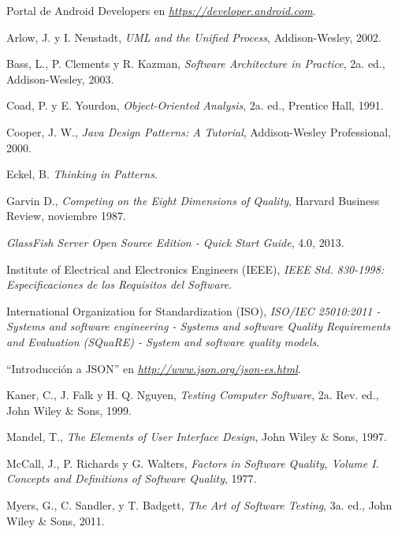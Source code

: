 \begin{thebibliography}{} %
	
	Portal de Android Developers en
	\emph{\url{https://developer.android.com}}.
	
	Arlow, J. y I. Neustadt, 
	\emph{UML and the Unified Process}, 
	Addison-Wesley, 
	2002.
	
	Bass, L., P. Clements y R. Kazman, 
	\emph{Software Architecture in Practice}, 
	2a. ed., 
	Addison-Wesley, 
	2003.
	
	Coad, P. y E. Yourdon, 
	\emph{Object-Oriented Analysis}, 
	2a. ed., 
	Prentice Hall, 
	1991.
	
	Cooper, J. W.,
	\emph{Java Design Patterns: A Tutorial}, 
	Addison-Wesley Professional, 
	2000.
	
	Eckel, B.
	\emph{Thinking in Patterns}.
	
	Garvin D.,
	\emph{Competing on the Eight Dimensions of Quality},
	Harvard Business Review, 
	noviembre 1987.
	
	\emph{GlassFish Server Open Source Edition - Quick Start Guide},
	4.0,
	2013.
	
	Institute of Electrical and Electronics Engineers (IEEE),
	\emph{IEEE Std. 830-1998: Especificaciones de los Requisitos del Software}.
	
	International Organization for Standardization (ISO),
	\emph{ISO/IEC 25010:2011 - Systems and software engineering - Systems and software Quality Requirements and Evaluation (SQuaRE) - System and software quality models}.
	
	``Introducción a JSON'' en
	\emph{\url{http://www.json.org/json-es.html}}.
	
	Kaner, C., J. Falk y H. Q. Nguyen,
	\emph{Testing Computer Software},
	2a. Rev. ed.,
	John Wiley \& Sons, 
	1999.
	
	Mandel, T.,
	\emph{The Elements of User Interface Design},
	John Wiley \& Sons, 
	1997.
	
	McCall, J., P. Richards y G. Walters,
	\emph{Factors in Software Quality, Volume I. Concepts and Definitions of Software Quality}, 
	1977.

	Myers, G., C. Sandler, y T. Badgett,
	\emph{The Art of Software Testing},
	3a. ed.,
	John Wiley \& Sons, 
	2011.
	

\end{thebibliography}
